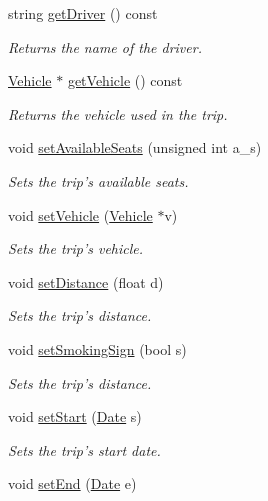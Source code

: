 \begin{DoxyCompactItemize}
\item 
string \hyperlink{class_trip_add7c86d5ee780f49b44df1d936229687}{get\+Driver} () const 
\begin{DoxyCompactList}\small\item\em Returns the name of the driver. \end{DoxyCompactList}\item 
\hyperlink{class_vehicle}{Vehicle} $\ast$ \hyperlink{class_trip_a7a2776544c9600f2e6a355e04f17e67b}{get\+Vehicle} () const 
\begin{DoxyCompactList}\small\item\em Returns the vehicle used in the trip. \end{DoxyCompactList}\item 
void \hyperlink{class_trip_a0166bf54e1fab842e494615041fb5bcd}{set\+Available\+Seats} (unsigned int a\+\_\+s)
\begin{DoxyCompactList}\small\item\em Sets the trip's available seats. \end{DoxyCompactList}\item 
void \hyperlink{class_trip_a011f6b53b9bdaf4f08106362fe0e391b}{set\+Vehicle} (\hyperlink{class_vehicle}{Vehicle} $\ast$v)
\begin{DoxyCompactList}\small\item\em Sets the trip's vehicle. \end{DoxyCompactList}\item 
void \hyperlink{class_trip_a17637add14f81f30c8f59f5812da2232}{set\+Distance} (float d)
\begin{DoxyCompactList}\small\item\em Sets the trip's distance. \end{DoxyCompactList}\item 
void \hyperlink{class_trip_a1df5fa0bd340a624e732c9452b62b4cb}{set\+Smoking\+Sign} (bool s)
\begin{DoxyCompactList}\small\item\em Sets the trip's distance. \end{DoxyCompactList}\item 
void \hyperlink{class_trip_a45b53f2a30771184c7a8491453cfa3da}{set\+Start} (\hyperlink{class_date}{Date} s)
\begin{DoxyCompactList}\small\item\em Sets the trip's start date. \end{DoxyCompactList}\item 
void \hyperlink{class_trip_a3d1b06fb96cbffd00cf16b4fe8ea1331}{set\+End} (\hyperlink{class_date}{Date} e)

\end{DoxyCompactItemize}
